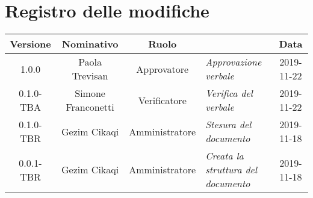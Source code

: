 \section*{Registro delle modifiche}
\renewcommand{\arraystretch}{1.8}

  \begin{longtable}{|c|c|c|p{3.8cm}|c|}
    \hline

    \rowcolor{header}
    \textbf{Versione} & \textbf{Nominativo} & \textbf{Ruolo} & \centering{\textbf{Descrizione}} & \textbf{Data}\\

    \hline

    1.0.0 & Paola Trevisan & Approvatore & \small{\textit{Approvazione verbale}} & 2019-11-22\\
    0.1.0-TBA & Simone Franconetti & Verificatore & \small{\textit{Verifica del verbale }} & 2019-11-22\\
    0.1.0-TBR & Gezim Cikaqi & Amministratore & \small{\textit{Stesura del documento}} & 2019-11-18\\
    0.0.1-TBR & Gezim Cikaqi & Amministratore & \small{\textit{Creata la struttura del documento}} & 2019-11-18\\

    \hline
  \end{longtable}
